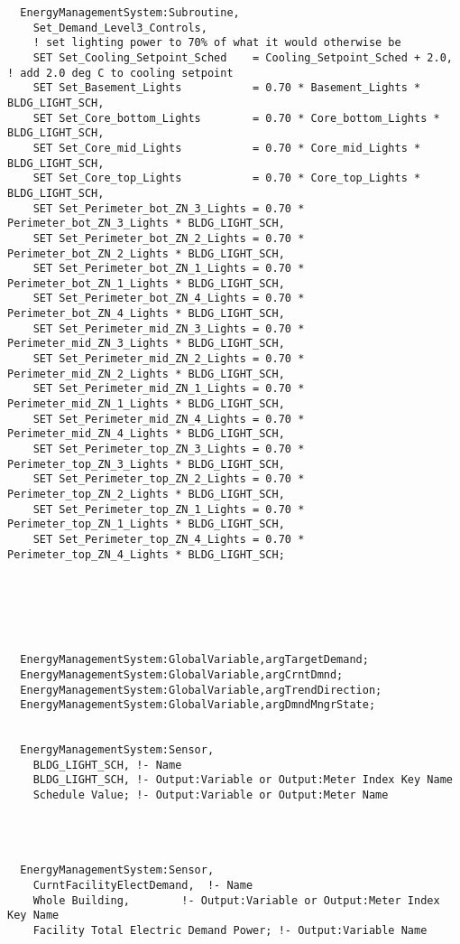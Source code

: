 \begin{lstlisting}
  EnergyManagementSystem:Subroutine,
    Set_Demand_Level3_Controls,
    ! set lighting power to 70% of what it would otherwise be
    SET Set_Cooling_Setpoint_Sched    = Cooling_Setpoint_Sched + 2.0, ! add 2.0 deg C to cooling setpoint
    SET Set_Basement_Lights           = 0.70 * Basement_Lights * BLDG_LIGHT_SCH,
    SET Set_Core_bottom_Lights        = 0.70 * Core_bottom_Lights * BLDG_LIGHT_SCH,
    SET Set_Core_mid_Lights           = 0.70 * Core_mid_Lights * BLDG_LIGHT_SCH,
    SET Set_Core_top_Lights           = 0.70 * Core_top_Lights * BLDG_LIGHT_SCH,
    SET Set_Perimeter_bot_ZN_3_Lights = 0.70 * Perimeter_bot_ZN_3_Lights * BLDG_LIGHT_SCH,
    SET Set_Perimeter_bot_ZN_2_Lights = 0.70 * Perimeter_bot_ZN_2_Lights * BLDG_LIGHT_SCH,
    SET Set_Perimeter_bot_ZN_1_Lights = 0.70 * Perimeter_bot_ZN_1_Lights * BLDG_LIGHT_SCH,
    SET Set_Perimeter_bot_ZN_4_Lights = 0.70 * Perimeter_bot_ZN_4_Lights * BLDG_LIGHT_SCH,
    SET Set_Perimeter_mid_ZN_3_Lights = 0.70 * Perimeter_mid_ZN_3_Lights * BLDG_LIGHT_SCH,
    SET Set_Perimeter_mid_ZN_2_Lights = 0.70 * Perimeter_mid_ZN_2_Lights * BLDG_LIGHT_SCH,
    SET Set_Perimeter_mid_ZN_1_Lights = 0.70 * Perimeter_mid_ZN_1_Lights * BLDG_LIGHT_SCH,
    SET Set_Perimeter_mid_ZN_4_Lights = 0.70 * Perimeter_mid_ZN_4_Lights * BLDG_LIGHT_SCH,
    SET Set_Perimeter_top_ZN_3_Lights = 0.70 * Perimeter_top_ZN_3_Lights * BLDG_LIGHT_SCH,
    SET Set_Perimeter_top_ZN_2_Lights = 0.70 * Perimeter_top_ZN_2_Lights * BLDG_LIGHT_SCH,
    SET Set_Perimeter_top_ZN_1_Lights = 0.70 * Perimeter_top_ZN_1_Lights * BLDG_LIGHT_SCH,
    SET Set_Perimeter_top_ZN_4_Lights = 0.70 * Perimeter_top_ZN_4_Lights * BLDG_LIGHT_SCH;






  EnergyManagementSystem:GlobalVariable,argTargetDemand;
  EnergyManagementSystem:GlobalVariable,argCrntDmnd;
  EnergyManagementSystem:GlobalVariable,argTrendDirection;
  EnergyManagementSystem:GlobalVariable,argDmndMngrState;


  EnergyManagementSystem:Sensor,
    BLDG_LIGHT_SCH, !- Name
    BLDG_LIGHT_SCH, !- Output:Variable or Output:Meter Index Key Name
    Schedule Value; !- Output:Variable or Output:Meter Name




  EnergyManagementSystem:Sensor,
    CurntFacilityElectDemand,  !- Name
    Whole Building,        !- Output:Variable or Output:Meter Index Key Name
    Facility Total Electric Demand Power; !- Output:Variable Name





\end{lstlisting}
